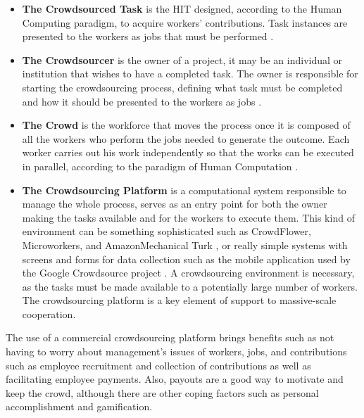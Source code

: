 \begin{itemize}

\item{\textbf{The Crowdsourced Task}} is the HIT designed, according to the Human Computing paradigm, to acquire workers' contributions. Task instances are presented to the workers as jobs that must be performed \cite{Difallah:2015:DMC:2736277.2741685}.

\item{\textbf{The Crowdsourcer}} is the owner of a project, it may be an individual or institution that wishes to have a completed task. The owner is responsible for starting the crowdsourcing process, defining what task must be completed and how it should be presented to the workers as jobs \cite{6861072}.

\item{\textbf{The Crowd}} is the workforce that moves the process once it is composed of all the workers who perform the jobs needed to generate the outcome. Each worker carries out his work independently so that the works can be executed in parallel, according to the paradigm of Human Computation \cite{Rohwer:2010:NHC:1837885.1837897}.

\item{\textbf{The Crowdsourcing Platform}} is a computational system responsible to manage the whole process, serves as an entry point for both the owner making the tasks available and for the workers to execute them. This kind of environment can be something sophisticated such as CrowdFlower, Microworkers, and AmazonMechanical Turk \cite{Difallah:2015:DMC:2736277.2741685}, or really simple systems with screens and forms for data collection such as the mobile application used by the Google Crowdsource project \cite{google_cs}. A crowdsourcing environment is necessary, as the tasks must be made available to a potentially large number of workers. The crowdsourcing platform is a key element of support to massive-scale cooperation.

\end{itemize}

The use of a commercial crowdsourcing platform brings benefits such as not having to worry about management's issues of workers, jobs, and contributions such as employee recruitment and collection of contributions as well as facilitating employee payments. Also, payouts are a good way to motivate and keep the crowd, although there are other coping factors such as personal accomplishment and gamification.



